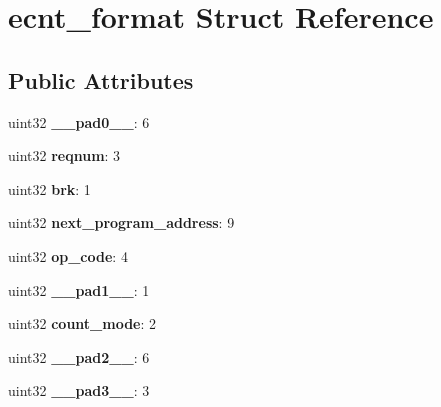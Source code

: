 \hypertarget{structecnt__format}{}\section{ecnt\+\_\+format Struct Reference}
\label{structecnt__format}
\subsection*{Public Attributes}
\begin{DoxyCompactItemize}
\item 
\mbox{\label{structecnt__format_a92198b99d7fcbbd4d24bdb64fe62ad80}} 
uint32 {\bfseries \+\_\+\+\_\+pad0\+\_\+\+\_\+}\+: 6
\item 
\mbox{\label{structecnt__format_aa17d2691d7660437494ff6cc220771be}} 
uint32 {\bfseries reqnum}\+: 3
\item 
\mbox{\label{structecnt__format_a007bb6b331dc2e8afe9a4fdebb03f58a}} 
uint32 {\bfseries brk}\+: 1
\item 
\mbox{\label{structecnt__format_a16da12967c3aaa210bb237dad378884c}} 
uint32 {\bfseries next\+\_\+program\+\_\+address}\+: 9
\item 
\mbox{\label{structecnt__format_a75e73cb3c8071dfccb95ef1db08add4b}} 
uint32 {\bfseries op\+\_\+code}\+: 4
\item 
\mbox{\label{structecnt__format_a31f9d77e82cbce0109b013be62ed13bb}} 
uint32 {\bfseries \+\_\+\+\_\+pad1\+\_\+\+\_\+}\+: 1
\item 
\mbox{\label{structecnt__format_a690dd555793cbd73ef7065e0cd84bb2d}} 
uint32 {\bfseries count\+\_\+mode}\+: 2
\item 
\mbox{\label{structecnt__format_aa998f9c48f04cacb6ee68a9cd27af27c}} 
uint32 {\bfseries \+\_\+\+\_\+pad2\+\_\+\+\_\+}\+: 6
\item 
\mbox{\label{structecnt__format_a218dc76eff252b478b6bf4f5fb0a438f}} 
uint32 {\bfseries \+\_\+\+\_\+pad3\+\_\+\+\_\+}\+: 3

\end{DoxyCompactItemize}
